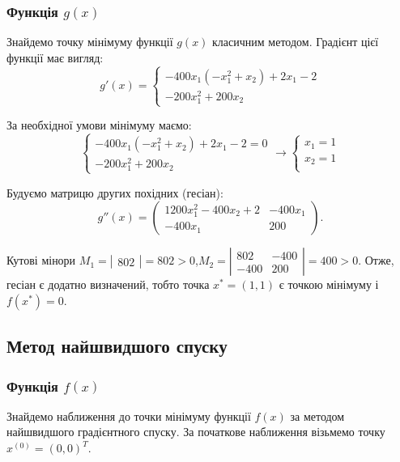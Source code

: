 \documentclass[14pt,a4paper]{extarticle}
\theoremstyle{definition}
\renewcommand{\[}{\begin{dmath*}[compact]}
\renewcommand{\]}{\end{dmath*}}
\begin{document}
\subsubsection{Функція $g(x)$}

Знайдемо точку мінімуму функції $g(x)$ класичним методом.
Градієнт цієї функції має вигляд:\[g'(x)=\left\{\begin{array}{l}- 400 x_{1} \left(- x_{1}^{2} + x_{2}\right) + 2 x_{1} - 2\\- 200 x_{1}^{2} + 200 x_{2}\end{array}\right.\]

За необхідної умови мінімуму маємо:
\[\left\{\begin{array}{l}- 400 x_{1} \left(- x_{1}^{2} + x_{2}\right) + 2 x_{1} - 2=0\\- 200 x_{1}^{2} + 200 x_{2}\end{array}\right.\to\left\{\begin{array}{l}x_{1}=1\\x_{2}=1\\\end{array}\right.\]

Будуємо матрицю других похідних (гесіан):
\[g''(x)=\left(\begin{matrix}1200 x_{1}^{2} - 400 x_{2} + 2 & - 400 x_{1}\\- 400 x_{1} & 200\end{matrix}\right).\]

Кутові мінори $M_1 = \left|\begin{matrix}802\end{matrix}\right| = 802 > 0$,$M_2 = \left|\begin{matrix}802 & -400\\-400 & 200\end{matrix}\right| = 400 > 0$. Отже, гесіан є додатно визначений, тобто точка $x^* = \left(1,1\right)$ є точкою мінімуму і $f(x^*) = 0$.

\subsection{Метод найшвидшого спуску}

\subsubsection{Функція $f(x)$}

Знайдемо наближення до точки мінімуму функції $f(x)$ за методом найшвидшого градієнтного спуску.
За початкове наближення візьмемо точку $x^{(0)}=(0,0)^T$.
\end{document}
